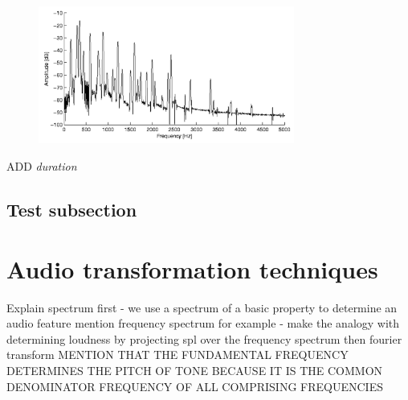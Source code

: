 \begin{figure}
    \centering
    \includegraphics[width=0.75\textwidth]{BackgroundTheory/spectral_envelope}
    \label{fig:spectral-envelope}
\end{figure}

ADD \textit{duration}



\subsection{Test subsection}
\label{sec:subsec21}

\section{Audio transformation techniques}
Explain spectrum first - we use a spectrum of a basic property to determine an
audio feature
mention frequency spectrum for example - make the analogy with determining
loudness by projecting spl over the frequency spectrum
then fourier transform
MENTION THAT THE FUNDAMENTAL FREQUENCY DETERMINES THE PITCH OF TONE BECAUSE IT
IS THE COMMON DENOMINATOR FREQUENCY OF ALL COMPRISING FREQUENCIES

\label{sec:audiotransform}
